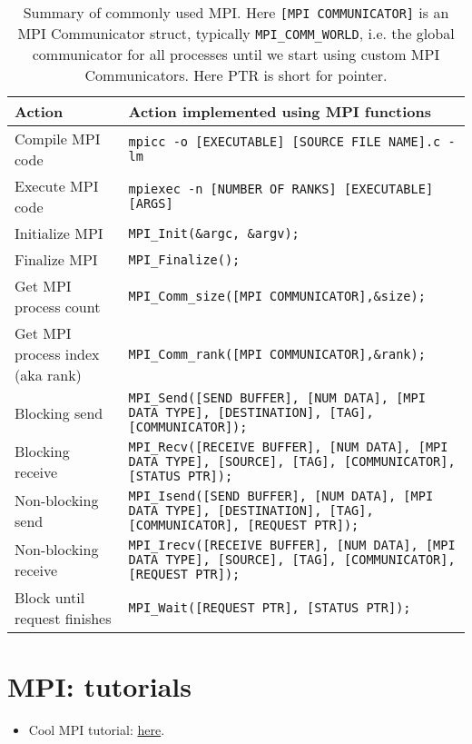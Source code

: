 \begin{table}[htbp!]
    \centering
    \begin{tabular}{p{1.5in}|p{4in}} \hline
      Action & Action implemented using MPI  functions\\ \hline
       Compile MPI code & \texttt{mpicc -o [EXECUTABLE] [SOURCE FILE NAME].c -lm} \\
       Execute MPI code & \texttt{mpiexec -n [NUMBER OF RANKS] [EXECUTABLE] [ARGS]} \\ \hline \hline
       Initialize MPI &  \texttt{MPI\_Init(\&argc, \&argv);} \\
       Finalize MPI & \texttt{MPI\_Finalize();} \\ \hline
        Get MPI process count &  \texttt{MPI\_Comm\_size([MPI COMMUNICATOR],\&size);} \\
         Get MPI process index (aka rank) &  \texttt{MPI\_Comm\_rank([MPI COMMUNICATOR],\&rank);} \\ \hline
         Blocking send & \texttt{MPI\_Send([SEND BUFFER], [NUM DATA], [MPI DATA TYPE], [DESTINATION], [TAG], [COMMUNICATOR]);} \\
         Blocking receive & \texttt{MPI\_Recv([RECEIVE BUFFER], [NUM DATA], [MPI DATA TYPE], [SOURCE], [TAG], [COMMUNICATOR], [STATUS PTR]);} \\ \hline
         Non-blocking send & \texttt{MPI\_Isend([SEND BUFFER], [NUM DATA], [MPI DATA TYPE], [DESTINATION], [TAG], [COMMUNICATOR], [REQUEST PTR]);} \\
         Non-blocking receive & \texttt{MPI\_Irecv([RECEIVE BUFFER], [NUM DATA], [MPI DATA TYPE], [SOURCE], [TAG], [COMMUNICATOR], [REQUEST PTR]);} \\
         Block until request finishes & \texttt{MPI\_Wait([REQUEST PTR], [STATUS PTR]);} \\
    \hline\end{tabular}
    \caption{Summary of commonly used MPI. Here \texttt{[MPI COMMUNICATOR]} is an MPI Communicator struct, typically \texttt{MPI\_COMM\_WORLD}, i.e. the global communicator for all processes until we start using custom MPI Communicators. Here PTR is short for pointer.}    
    \label{mpiBasicAPI.tab}
\end{table}


\section{MPI: tutorials}

\begin{itemize}
    \item Cool MPI tutorial: \href{https://www.codingame.com/playgrounds/349/introduction-to-mpi/introduction-to-distributed-computing}{here}.
\end{itemize}